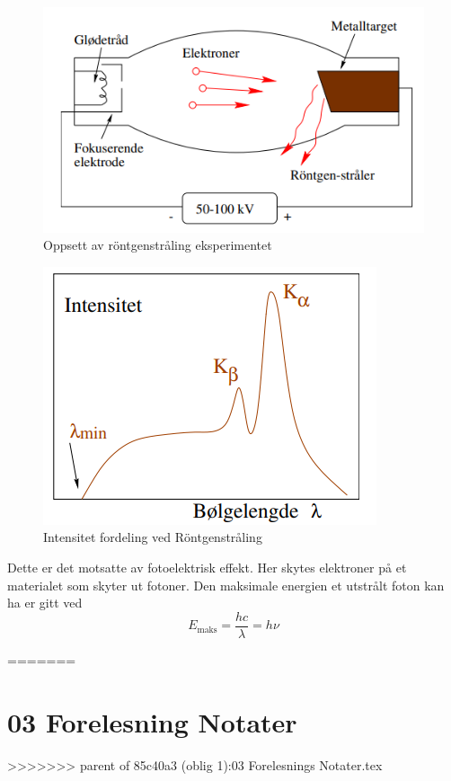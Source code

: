 \begin{figure}[h!]
    \centering
    \includegraphics[scale = .5]{Figures/Rontgenstraaling oppsett.png}
    \caption{Oppsett av röntgenstråling eksperimentet}
    \label{fig: Rontgenstraaling oppsett}
\end{figure}

\begin{figure}[h!]
  \centering
  \includegraphics[scale = .5]{Figures/Rontgenstraaling intensitetfordeling.png}
  \caption{Intensitet fordeling ved Röntgenstråling}
  \label{fig: Intensitets fordeling Rontgenstraaling}
\end{figure}

Dette er det motsatte av fotoelektrisk effekt. Her skytes elektroner på et materialet som skyter ut fotoner. Den maksimale energien et utstrålt foton kan ha er gitt ved 
\[
E_{\text{maks}} = \frac{hc}{\lambda} = hν
\]

  
=======
\chapter{03 Forelesning Notater}
>>>>>>> parent of 85c40a3 (oblig 1):03 Forelesnings Notater.tex
